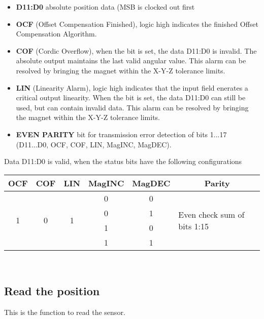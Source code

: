 \begin{itemize}
	\item \textbf{D11:D0} absolute position data (MSB is clocked out first
	\item \textbf{OCF} (Offset Compensation Finished), logic high indicates the finished Offset Compensation Algorithm.
	\item \textbf{COF} (Cordic Overflow), when the bit is set, the data D11:D0 is invalid. The absolute output maintains the last valid angular value. This alarm can be resolved by bringing the magnet within the X-Y-Z tolerance limits.
	\item \textbf{LIN} (Linearity Alarm), logic high indicates that the input field enerates a critical output linearity. When the bit is set, the data D11:D0 can still be used, but can contain invalid data. This alarm can be resolved by bringing the magnet within the X-Y-Z tolerance limits. 
	\item \textbf{EVEN PARITY} bit for transmission error detection of bits 1...17 (D11...D0, OCF, COF, LIN, MagINC, MagDEC).
\end{itemize}

\noindent Data D11:D0 is valid, when the status bits have the following configurations

\begin{center}
	\begin{tabular}{|c|c|c|c|c|p{5cm}|}
	\hline 
	OCF & COF & LIN & MagINC & MagDEC & \multicolumn{1}{c|}{Parity}\\
	\hline
	
	\multirow{4}{*}{1} & \multirow{4}{*}{0} & \multirow{4}{*}{1} & 0 & 0 & \multirow{4}{*}{Even check sum of bits 1:15} \\ \cline{4-5}
	
	 & & & 0 & 1 & \\ \cline{4-5}
	 & & & 1 & 0 & \\ \cline{4-5}
	 & & & 1 & 1 & \\ \hline
	\end{tabular}
\end{center}

\

\subsection{Read the position}


This is the function to read the sensor.


